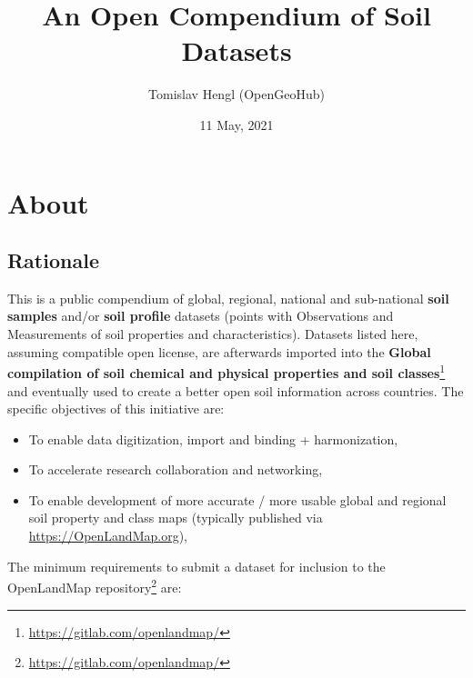 \documentclass[
  graybox,natbib,nospthms]{svmono}
\title{An Open Compendium of Soil Datasets}
\author{Tomislav Hengl (OpenGeoHub)}
\date{11 May, 2021}
\providecommand{\tightlist}{%
  \setlength{\itemsep}{0pt}\setlength{\parskip}{0pt}}
\providecommand{\tightlist}{\setlength{\itemsep}{0pt}\setlength{\parskip}{0pt}}
\renewcommand{\href}[2]{#2 (\url{#1})}
\renewcommand{\href}[2]{#2\footnote{\url{#1}}}
\begin{document}
\maketitle

\thispagestyle{empty}
\begin{center}
\end{center}

\setlength{\abovedisplayskip}{-5pt}
\setlength{\abovedisplayshortskip}{-5pt}

{
\hypersetup{linkcolor=}
\setcounter{tocdepth}{1}
\tableofcontents
}
\hypertarget{about}{%
\chapter{About}\label{about}}

\hypertarget{rationale}{%
\section{Rationale}\label{rationale}}

This is a public compendium of global, regional, national and
sub-national \textbf{soil samples} and/or \textbf{soil profile} datasets (points with
Observations and Measurements of soil properties and characteristics).
Datasets listed here, assuming compatible open license, are afterwards
imported into the \href{https://gitlab.com/openlandmap/}{\textbf{Global compilation of soil chemical and physical
properties and soil classes}} and
eventually used to create a better open soil information across countries.
The specific objectives of this initiative are:

\begin{itemize}
\tightlist
\item
  To enable data digitization, import and binding + harmonization,\\
\item
  To accelerate research collaboration and networking,\\
\item
  To enable development of more accurate / more usable global and
  regional soil property and class maps (typically published via
  \url{https://OpenLandMap.org}),
\end{itemize}

The minimum requirements to submit a dataset for inclusion to \href{https://gitlab.com/openlandmap/}{the
OpenLandMap repository} are:
\end{document}
